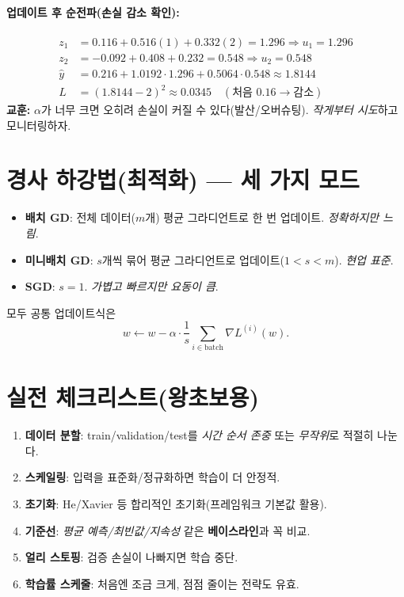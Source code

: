 \documentclass[12pt]{article}
\begin{document}
\paragraph{업데이트 후 순전파(손실 감소 확인):}
\[
\begin{aligned}
z_1 &= 0.116 + 0.516(1) + 0.332(2) = 1.296 \Rightarrow u_1=1.296 \\
z_2 &= -0.092 + 0.408 + 0.232 = 0.548 \Rightarrow u_2=0.548 \\
\hat{y} &= 0.216 + 1.0192\cdot 1.296 + 0.5064\cdot 0.548 \approx 1.8144 \\
L &= (1.8144-2)^2 \approx 0.0345 \quad (\textbf{처음 }0.16\to \textbf{감소})
\end{aligned}
\]
\textbf{교훈:} \(\alpha\)가 너무 크면 오히려 손실이 커질 수 있다(발산/오버슈팅). \textit{작게부터 시도}하고 모니터링하자.

\section{경사 하강법(최적화) — 세 가지 모드}
\begin{itemize}
  \item \textbf{배치 GD}: 전체 데이터($m$개) 평균 그라디언트로 한 번 업데이트. \textit{정확하지만 느림}.
  \item \textbf{미니배치 GD}: $s$개씩 묶어 평균 그라디언트로 업데이트(\(1< s < m\)). \textit{현업 표준}.
  \item \textbf{SGD}: $s=1$. \textit{가볍고 빠르지만 요동이 큼}.
\end{itemize}
모두 공통 업데이트식은
\[
w \leftarrow w - \alpha \cdot \frac{1}{s}\sum_{i\in \text{batch}} \nabla L^{(i)}(w).
\]

\section{실전 체크리스트(왕초보용)}
\begin{enumerate}[left=0pt]
  \item \textbf{데이터 분할}: train/validation/test를 \textit{시간 순서 존중} 또는 \textit{무작위}로 적절히 나눈다.
  \item \textbf{스케일링}: 입력을 표준화/정규화하면 학습이 더 안정적.
  \item \textbf{초기화}: He/Xavier 등 합리적인 초기화(프레임워크 기본값 활용).
  \item \textbf{기준선}: \textit{평균 예측/최빈값/지속성} 같은 \textbf{베이스라인}과 꼭 비교.
  \item \textbf{얼리 스토핑}: 검증 손실이 나빠지면 학습 중단.
  \item \textbf{학습률 스케줄}: 처음엔 조금 크게, 점점 줄이는 전략도 유효.
\end{enumerate}
\end{document}
